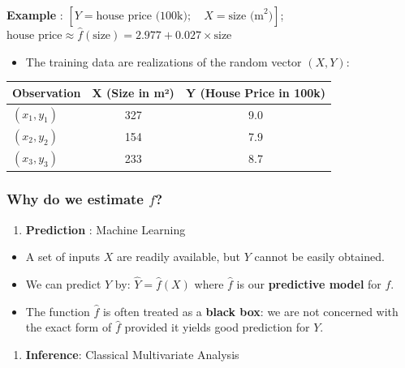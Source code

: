 \documentclass[
  letterpaper,
  DIV=11,
  numbers=noendperiod]{scrartcl}
\providecommand{\tightlist}{%
  \setlength{\itemsep}{0pt}\setlength{\parskip}{0pt}}\usepackage{longtable,booktabs,array}
\begin{document}
\textbf{Example} :
\([Y = \text{house price (100k)}; \quad X = \text{size (m}^2)]\);
\(\text{house price} \approx \hat{f}(\text{size}) = 2.977 + 0.027 \times \text{size}\)

\begin{itemize}
\tightlist
\item
  The training data are realizations of the random vector \((X, Y)\):
\end{itemize}

\begin{longtable}[]{@{}lcc@{}}
\toprule\noalign{}
Observation & X (Size in m²) & Y (House Price in 100k) \\
\midrule\noalign{}
\endhead
\bottomrule\noalign{}
\endlastfoot
\((x_1, y_1)\) & 327 & 9.0 \\
\((x_2, y_2)\) & 154 & 7.9 \\
\((x_3, y_3)\) & 233 & 8.7 \\
\end{longtable}

\subsubsection{\texorpdfstring{Why do we estimate
\(f\)?}{Why do we estimate f?}}\label{why-do-we-estimate-f}

\begin{enumerate}
\def\labelenumi{\arabic{enumi}.}
\tightlist
\item
  \textbf{Prediction} : Machine Learning
\end{enumerate}

\begin{itemize}
\tightlist
\item
  A set of inputs \(X\) are readily available, but \(Y\) cannot be
  easily obtained.
\item
  We can predict \(Y\) by: \(\hat{Y} = \hat{f}(X)\) where \(\hat{f}\) is
  our \textbf{predictive model} for \(f\).
\item
  The function \(\hat{f}\) is often treated as a \textbf{black box}: we
  are not concerned with the exact form of \(\hat{f}\) provided it
  yields good prediction for \(Y\).
\end{itemize}

\begin{enumerate}
\def\labelenumi{\arabic{enumi}.}
\setcounter{enumi}{1}
\tightlist
\item
  \textbf{Inference}: Classical Multivariate Analysis
\end{enumerate}
\end{document}

